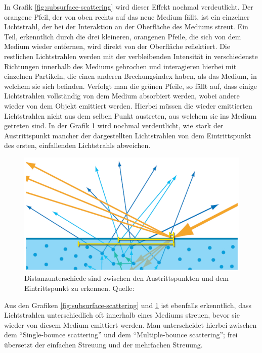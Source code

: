 \documentclass[ngerman,runningheads,a4paper]{llncs}[2018/03/10]
\begin{document}
In Grafik \ref{fig:subsurface-scattering} wird dieser Effekt nochmal verdeutlicht. Der orangene Pfeil, der von oben rechts auf das neue Medium fällt, ist ein einzelner Lichtstrahl, der bei der Interaktion an der Oberfläche des Mediums streut. Ein Teil, erkenntlich durch die drei kleineren, orangenen Pfeile, die sich von dem Medium wieder entfernen, wird direkt von der Oberfläche reflektiert.
Die restlichen Lichtstrahlen werden mit der verbleibenden Intensität in verschiedenste Richtungen innerhalb des Mediums gebrochen und interagieren hierbei mit einzelnen Partikeln, die einen anderen Brechungsindex haben, als das Medium, in welchem sie sich befinden.
Verfolgt man die grünen Pfeile, so fällt auf, dass einige Lichtstrahlen vollständig von dem Medium absorbiert werden, wobei andere wieder von dem Objekt emittiert werden.
Hierbei müssen die wieder emittierten Lichtstrahlen nicht aus dem selben Punkt austreten, aus welchem sie ins Medium getreten sind. In der Grafik \ref{fig:subsurface-scattering-different-exit-point} wird nochmal verdeutlicht, wie stark der Austrittspunkt mancher der dargestellten Lichtstrahlen von dem Eintrittspunkt des ersten, einfallenden Lichtstrahls abweichen.

\begin{figure}
  \centering
  \includegraphics[scale=0.3,keepaspectratio]{./images/subsurface-scattering-distance-difference.jpg}
  \caption{Distanzunterschiede sind zwischen den Austrittspunkten und dem Eintrittspunkt zu erkennen. Quelle: \cite{real-time-rendering}}
  \label{fig:subsurface-scattering-different-exit-point}
\end{figure}

Aus den Grafiken \ref{fig:subsurface-scattering} und \ref{fig:subsurface-scattering-different-exit-point} ist ebenfalls erkenntlich, dass Lichtstrahlen unterschiedlich oft innerhalb eines Mediums streuen, bevor sie wieder von diesem Medium emittiert werden.
Man unterscheidet hierbei zwischen dem \enquote{Single-bounce scattering} und dem \enquote{Multiple-bounce scattering}; frei übersetzt der einfachen Streuung und der mehrfachen Streuung.
\end{document}
